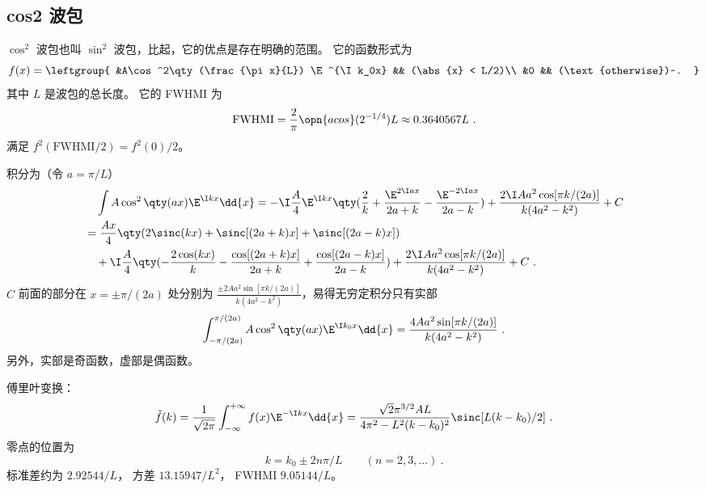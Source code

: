 
\subsection{cos2 波包}
$\cos^2$ 波包也叫 $\sin^2$ 波包，比起，它的优点是存在明确的范围。 它的函数形式为
\begin{equation}\label{eq_cos2wp_5}
f(x) = \leftgroup{
&A\cos^2\qty(\frac{\pi x}{L}) \E^{\I k_0x} && (\abs{x} < L/2)\\
&0 && (\text{otherwise})~.
}\end{equation}
其中 $L$ 是波包的总长度。 它的 FWHMI 为
\begin{equation}\label{eq_cos2wp_4} %
\text{FWHMI} = \frac{2}{\pi}\opn{acos}(2^{-1/4}) L \approx 0.3640567 L~.
\end{equation}
满足 $f^2(\text{FWHMI/2}) = f^2(0)/2$。

积分为（令 $a = \pi/L$）
\begin{equation}\label{eq_cos2wp_2} %
\begin{aligned}
&\quad \int A\cos^2\qty(a x) \E^{\I kx} \dd{x} = -\I\frac{A}{4}\E^{\I kx}\qty(\frac{2}{k} +\frac{\E^{2\I ax}}{2a+k} -\frac{\E^{-2\I ax}}{2a-k}) + \frac{2\I Aa^2\cos[{\pi k}/{(2a)}]}{k(4 a^2 -k^2)} + C\\
&= \frac{Ax}{4} \qty(2\sinc(k x) + \sinc[(2 a+k)x] + \sinc[(2 a-k)x])\\
&\quad + \I\frac{A}{4} \qty(-\frac{2\cos(k x)}{k} -\frac{\cos[(2 a+k)x]}{2 a+k} +\frac{\cos[(2 a-k)x]}{2 a-k}) + \frac{2\I Aa^2\cos[{\pi k}/{(2a)}]}{k(4 a^2 -k^2)} + C~.
\end{aligned}
\end{equation}
$C$ 前面的部分在 $x = \pm\pi/(2a)$ 处分别为 $\frac{\pm 2 Aa^2\sin[{\pi k}/{(2a)}]}{k(4 a^2 -k^2)}$，易得无穷定积分只有实部
\begin{equation}%
\int_{-\pi/(2a)}^{\pi/(2a)} A\cos^2\qty(a x)\E^{\I k_0x} \dd{x} = \frac{4 Aa^2\sin[{\pi k}/{(2a)}]}{k(4 a^2 -k^2)}~.
\end{equation}
另外，实部是奇函数，虚部是偶函数。

傅里叶变换：
\begin{equation} %
\tilde f(k) = \frac{1}{\sqrt{2\pi}} \int_{-\infty}^{+\infty} f(x) \E^{-\I k x} \dd{x}
= \frac{\sqrt{2} \pi ^{3/2} A L}{4 \pi ^2-L^2 (k-k_0)^2} \sinc[L(k-k_0)/2]~.
\end{equation}
零点的位置为
\begin{equation} %
k = k_0 \pm 2n\pi/L \qquad (n=2,3,\dots)~.
\end{equation}
标准差约为 $2.92544/L$， 方差 $13.15947/L^2$， FWHMI $9.05144/L$。

